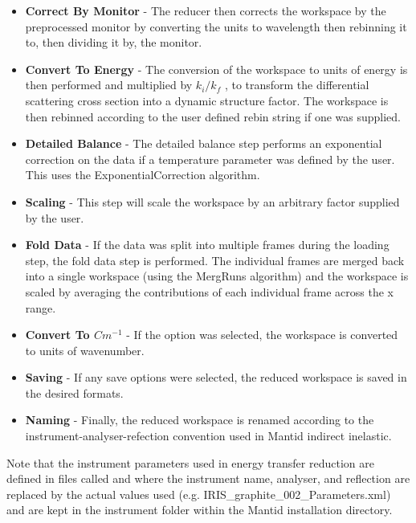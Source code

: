 \documentclass[paper=a4, fontsize=11pt]{scrartcl}	%
\numberwithin{equation}{section}															%
\numberwithin{figure}{section}																%
\numberwithin{table}{section}																%
\begin{document}
\begin{itemize}
\item \textbf{Correct By Monitor} - The reducer then corrects the workspace by the preprocessed monitor by converting the units to wavelength then rebinning it to, then dividing it by, the monitor.

\item \textbf{Convert To Energy} - The conversion of the workspace to units of energy is then performed and multiplied by $k_i / k_f$ , to transform the differential scattering cross section into a dynamic structure factor. The workspace is then rebinned according to the user defined rebin string if one was supplied.

\item \textbf{Detailed Balance} - The detailed balance step performs an exponential correction on the data if a temperature parameter was defined by the user. This uses the ExponentialCorrection algorithm.

\item \textbf{Scaling} - This step will scale the workspace by an arbitrary factor supplied by the user.

\item \textbf{Fold Data} - If the data was split into multiple frames during the loading step, the fold data step is performed. The individual frames are merged back into a single workspace (using the MergRuns algorithm) and the workspace is scaled by averaging the contributions of each individual frame across the x range.

\item \textbf{Convert To $Cm^{-1}$} - If the option was selected, the workspace is converted to units of wavenumber.

\item \textbf{Saving} - If any save options were selected, the reduced workspace is saved in the desired formats.
\item \textbf{Naming} - Finally, the reduced workspace is renamed according to the instrument-analyser-refection convention used in Mantid indirect inelastic.
\end{itemize}

Note that the instrument parameters used in energy transfer reduction are defined in files called  and  where the instrument name, analyser, and reflection are replaced by the actual values used (e.g. IRIS\_graphite\_002\_Parameters.xml) and are kept in the instrument folder within the Mantid installation directory.
\end{document}
